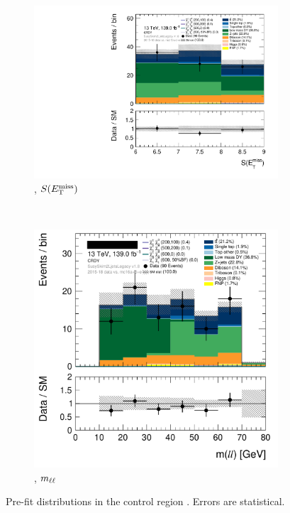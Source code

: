 \begin{figure}[tp]
\centering
\begin{subfigure}{0.62\textwidth}
\centering
\includegraphics[width=\textwidth]{figures/2ljets_def_met_Sign_CRDY.pdf}
\caption{\crdy, $S(E_\mathrm{T}^\mathrm{miss})$}
\end{subfigure}
\\
\begin{subfigure}{0.62\textwidth}
\centering
\includegraphics[width=\textwidth]{figures/2ljets_def_mll_CRDY.png}
\caption{\crdy, $m_{\ell\ell}$}
\end{subfigure}
\caption[
Pre-fit distributions in the control region CR-DY
]{%
Pre-fit distributions in the control region \crdy.
Errors are statistical.
}
\label{fig:2ljets_offshell_cr_region}
\end{figure}

